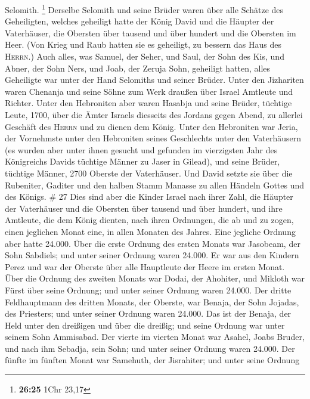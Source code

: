 Selomith. \footnote{\textbf{26:25} 1Chr 23,17}  Derselbe
Selomith und seine Brüder waren über alle Schätze des Geheiligten,
welches geheiligt hatte der König David und die Häupter der Vaterhäuser,
die Obersten über tausend und über hundert und die Obersten im Heer.
 (Von Krieg und Raub hatten sie es geheiligt, zu bessern
das Haus des \textsc{Herrn}.)  Auch alles, was Samuel,
der Seher, und Saul, der Sohn des Kis, und Abner, der Sohn Ners, und
Joab, der Zeruja Sohn, geheiligt hatten, alles Geheiligte war unter der
Hand Selomiths und seiner Brüder.  Unter den Jizhariten
waren Chenanja und seine Söhne zum Werk draußen über Israel Amtleute und
Richter.  Unter den Hebroniten aber waren Hasabja und
seine Brüder, tüchtige Leute, 1700, über die Ämter Israels diesseits des
Jordans gegen Abend, zu allerlei Geschäft des \textsc{Herrn} und zu
dienen dem König.  Unter den Hebroniten war Jeria, der
Vornehmste unter den Hebroniten seines Geschlechts unter den
Vaterhäusern (es wurden aber unter ihnen gesucht und gefunden im
vierzigsten Jahr des Königreichs Davids tüchtige Männer zu Jaser in
Gilead),  und seine Brüder, tüchtige Männer, 2700 Oberste
der Vaterhäuser. Und David setzte sie über die Rubeniter, Gaditer und
den halben Stamm Manasse zu allen Händeln Gottes und des Königs. \# 27
 Dies sind aber die Kinder Israel nach ihrer Zahl, die
Häupter der Vaterhäuser und die Obersten über tausend und über hundert,
und ihre Amtleute, die dem König dienten, nach ihren Ordnungen, die ab
und zu zogen, einen jeglichen Monat eine, in allen Monaten des Jahres.
Eine jegliche Ordnung aber hatte 24.000.  Über die erste
Ordnung des ersten Monats war Jasobeam, der Sohn Sabdiels; und unter
seiner Ordnung waren 24.000.  Er war aus den Kindern Perez
und war der Oberste über alle Hauptleute der Heere im ersten Monat.
 Über die Ordnung des zweiten Monats war Dodai, der
Ahohiter, und Mikloth war Fürst über seine Ordnung; und unter seiner
Ordnung waren 24.000.  Der dritte Feldhauptmann des
dritten Monats, der Oberste, war Benaja, der Sohn Jojadas, des
Priesters; und unter seiner Ordnung waren 24.000.  Das ist
der Benaja, der Held unter den dreißigen und über die dreißig; und seine
Ordnung war unter seinem Sohn Ammisabad.  Der vierte im
vierten Monat war Asahel, Joabs Bruder, und nach ihm Sebadja, sein Sohn;
und unter seiner Ordnung waren 24.000.  Der fünfte im
fünften Monat war Samehuth, der Jisrahiter; und unter seine Ordnung
